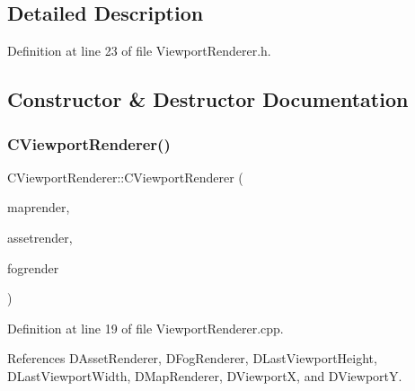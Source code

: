 \subsection{Detailed Description}


Definition at line 23 of file Viewport\+Renderer.\+h.



\subsection{Constructor \& Destructor Documentation}
\hypertarget{classCViewportRenderer_a21067af3982b3e7468e3770c50a7c6a0}{}\label{classCViewportRenderer_a21067af3982b3e7468e3770c50a7c6a0} 
\subsubsection{\texorpdfstring{C\+Viewport\+Renderer()}{CViewportRenderer()}}
{\footnotesize\ttfamily C\+Viewport\+Renderer\+::\+C\+Viewport\+Renderer (\begin{DoxyParamCaption}\item[{std\+::shared\+\_\+ptr$<$ \hyperlink{classCMapRenderer}{C\+Map\+Renderer} $>$}]{maprender,  }\item[{std\+::shared\+\_\+ptr$<$ \hyperlink{classCAssetRenderer}{C\+Asset\+Renderer} $>$}]{assetrender,  }\item[{std\+::shared\+\_\+ptr$<$ \hyperlink{classCFogRenderer}{C\+Fog\+Renderer} $>$}]{fogrender }\end{DoxyParamCaption})}



Definition at line 19 of file Viewport\+Renderer.\+cpp.



References D\+Asset\+Renderer, D\+Fog\+Renderer, D\+Last\+Viewport\+Height, D\+Last\+Viewport\+Width, D\+Map\+Renderer, D\+ViewportX, and D\+ViewportY.


